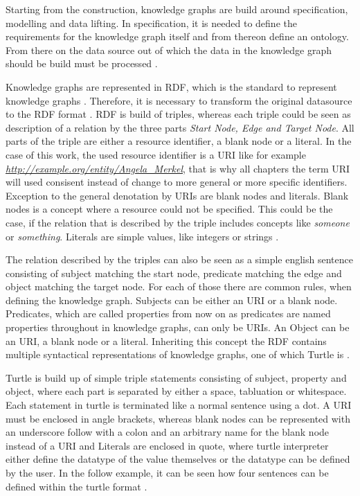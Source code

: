 \documentclass[a4paper,oneside,bibliography=totoc]{scrbook}
\begin{document}
Starting from the construction, knowledge graphs are build around specification, modelling and data lifting. In specification, it is needed to define the requirements for the knowledge graph itself and from thereon define an ontology. From there on the data source out of which the data in the knowledge graph should be build must be processed \cite{VillazonTerrazas2017a}.

Knowledge graphs are represented in \ac{RDF}, which is the standard to represent knowledge graphs \cite{VillazonTerrazas2017}. Therefore, it is necessary to transform the original datasource to the \ac{RDF} format \cite{VillazonTerrazas2017a}. \ac{RDF} is build of triples, whereas each triple could be seen as description of a relation by the three parts \textit{Start Node, Edge and Target Node}. All parts of the triple are either a resource identifier, a blank node or a literal. In the case of this work, the used resource identifier is a \ac{URI} like for example \textit{\url{http://example.org/entity/Angela_Merkel}}, that is why all chapters the term \ac{URI} will used consisent instead of change to more general or more specific identifiers. Exception to the general denotation by \acp{URI} are blank nodes and literals. Blank nodes is a concept where a resource could not be specified. This could be the case, if the relation that is described by the triple includes concepts like \textit{someone} or \textit{something}. Literals are simple values, like integers or strings \cite{VillazonTerrazas2017}.

The relation described by the triples can also be seen as a simple english sentence consisting of subject matching the start node, predicate matching the edge and object matching the target node. For each of those there are common rules, when defining the knowledge graph. Subjects can be either an \ac{URI} or a blank node. Predicates, which are called properties from now on as predicates are named properties throughout in knowledge graphs, can only be \acp{URI}. An Object can be an \ac{URI}, a blank node or a literal. Inheriting this concept the \ac{RDF} contains multiple syntactical representations of knowledge graphs, one of which Turtle is \cite{VillazonTerrazas2017}.

Turtle is build up of simple triple statements consisting of subject, property and object, where each part is separated by either a space, tabluation or whitespace. Each statement in turtle is terminated like a normal sentence using a dot. A \ac{URI} must be enclosed in angle brackets, whereas blank nodes can be represented with an underscore follow with a colon and an arbitrary name for the blank node instead of a \ac{URI} and Literals are enclosed in quote, where turtle interpreter either define the datatype of the value themselves or the datatype can be defined by the user. In the follow example, it can be seen how four sentences can be defined within the turtle format \cite{Tomaszuk2020}.
\end{document}
